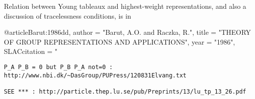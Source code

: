 \documentclass[11pt]{article}
\begin{document}
Relation between Young tableaux and highest-weight representations,
and also a discussion of tracelessness conditions, is in 

@article{Barut:1986dd,
      author         = "Barut, A.O. and Raczka, R.",
      title          = "{THEORY OF GROUP REPRESENTATIONS AND APPLICATIONS}",
      year           = "1986",
      SLACcitation   = "%
}

\begin{verbatim}
P_A P_B = 0 but P_B P_A not=0 :
http://www.nbi.dk/~DasGroup/PUPress/120831Elvang.txt

SEE *** : http://particle.thep.lu.se/pub/Preprints/13/lu_tp_13_26.pdf
\end{verbatim}
\end{document}
